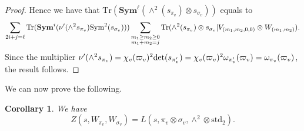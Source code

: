 \documentclass[11pt, reqno]{amsart}
\theoremstyle{plain}
\newtheorem{corollary}[theorem]{Corollary}
\theoremstyle{definition}
\theoremstyle{remark}
\theoremstyle{plain}
\begin{document}
\begin{proof}
    Hence we have that $\mathrm{Tr}\left(\mathbf{Sym}^\ell \left(\wedge^2(s_{\pi_v})\otimes s_{\sigma_v}\right)\right)$ equals to
\[\sum_{2 i + j = \ell}  \mathrm{Tr}( \mathbf{Sym}^i( \nu'(\wedge^2 s_{\pi_v}){\rm Sym}^2( s_{\sigma_v})))  \sum_{\substack{m_1\geq m_2 \geq 0 \\  m_1 + m_2 = j }} \mathrm{Tr}( \wedge^2 (s_{\pi_v})\otimes s_{\sigma_v}|V_{(m_1,m_2,0,0)} \otimes W_{(m_1,m_2)}). \]
Since the multiplier $\nu'(\wedge^2 s_{\pi_v}) = \chi_v(\varpi_v)^2 {\rm det}(s_{\pi_v'}) = \chi_v(\varpi_v)^2 \omega_{\pi_v'}(\varpi_v) = \omega_{\pi_v}(\varpi_v)$, the result follows.
\end{proof}

We can now prove the following.

\begin{corollary}\label{Lrequaltowedge}
We have
\[Z(s,W_{\pi_v},W_{\sigma_v}) =L(s,\pi_v\otimes \sigma_v,\wedge^2 \otimes \mathrm{std}_2).\]
\end{corollary}
\end{document}
